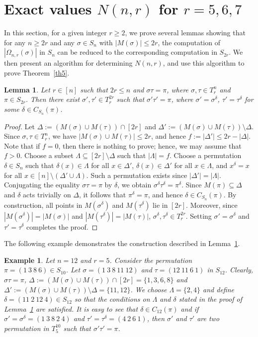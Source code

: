 \documentclass{amsart}
\newtheorem{lem}[thm]{Lemma}
\newtheorem{exm}[thm]{Example}
\numberwithin{equation}{section}
\begin{document}
\section{Exact values $N(n,r)$ for $r = 5,6,7$}
In this section,  for a given integer $r\geq 2$, we prove several lemmas showing that for any $n \ge 2r$ and any $\sigma \in S_n$ with $|M(\sigma)| \le 2r$, the computation of $|\Omega_{n,r}(\sigma)|$ in $S_n$ can be reduced to the corresponding computation in $S_{2r}$. We then present an algorithm for determining $N(n,r)$, and use this algorithm to prove Theorem~\ref{th5}.
\begin{lem}\label{lem1}
Let $r\in [n]$ such that $2r\leq n$ and $\sigma \tau=\pi$, where $\sigma, \tau \in T_r^n$ and $\pi \in S_{2r}$. Then there exist $\sigma',\tau'\in T_r^{2r}$ such that $\sigma' \tau'=\pi$, where $\sigma'=\sigma^\delta$, $\tau'=\tau^\delta$ for some $\delta\in C_{S_n}(\pi)$. 
\end{lem}
\begin{proof}
Let $\Delta := (M(\sigma)\cup M(\tau))\cap [2r]$ and $\Delta' := (M(\sigma)\cup M(\tau))\setminus \Delta$. Since $\sigma,\tau\in T_r^n$, we have $|M(\sigma)\cup M(\tau)|\le 2r$, and hence $f:=|\Delta'|\le 2r-|\Delta|$. Note that if $f=0$, then there is nothing to prove; hence, we may assume that $f>0$. Choose a subset $\Lambda\subseteq [2r]\setminus \Delta$ such that $|\Lambda|=f$. Choose a permutation $\delta\in S_n$ such that $\delta(x)\in\Lambda$ for all $x\in\Delta'$, $\delta(x)\in\Delta'$ for all $x\in\Lambda$, and $x^\delta=x$ for all $x\in [n]\setminus(\Delta'\cup\Lambda)$. Such a permutation exists since $|\Delta'|=|\Lambda|$. Conjugating the equality $\sigma\tau=\pi$ by $\delta$, we obtain $\sigma^\delta\tau^\delta=\pi^\delta$. Since $M(\pi)\subseteq \Delta$ and $\delta$ acts trivially on $\Delta$, it follows that $\pi^\delta=\pi$, and hence $\delta\in C_{S_n}(\pi)$. By construction, all points in $M(\sigma^\delta)$ and $M(\tau^\delta)$ lie in $[2r]$. Moreover, since $|M(\sigma^\delta)|=|M(\sigma)|$ and $|M(\tau^\delta)|=|M(\tau)|$, $\sigma^\delta,\tau^\delta\in T_r^{2r}$. Setting $\sigma'=\sigma^\delta$ and $\tau'=\tau^\delta$ completes the proof.
\end{proof}
The following example demonstrates the construction described in Lemma~\ref{lem1}.
\begin{exm}
Let $n=12$ and $r=5$. Consider the permutation $\pi=(1\ 3\ 8\ 6)\in S_{10}$. Let $\sigma=(1\ 3\ 8\ 11\ 12)$ and $\tau =(12\ 11\ 6\ 1)$ in $S_{12}$. Clearly,   $\sigma\tau =\pi$, $\Delta := (M(\sigma)\cup M(\tau))\cap [2r]=\{1,3,6,8\}$ and $\Delta' := (M(\sigma)\cup M(\tau))\setminus \Delta=\{11,12\}$. We choose $\Lambda=\{2,4\}$ and define $\delta=(11\ 2\ 12\ 4)\in S_{12}$ so that the conditions on $\Lambda$ and $\delta$ stated in the proof of Lemma~\ref{lem1} are satisfied. It is easy to see that $\delta\in C_{12}(\pi)$ and if   $\sigma'=\sigma^\delta=(1\ 3\ 8\ 2\ 4)$ and  $\tau'=\tau^\delta=(4\ 2\ 6\ 1)$, then $\sigma'$ and $\tau' $ are two permutation in $T_{5}^{10}$ such that  $\sigma' \tau'=\pi$. 
\end{exm}
\end{document}
